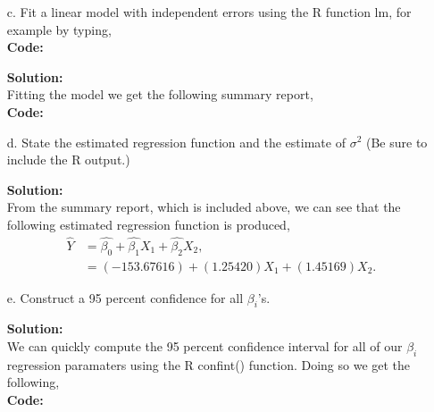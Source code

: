 \documentclass[12pt]{article}
\makeatletter
\theoremstyle{homework}
\newenvironment{exercise}[1]
{\def\@currentlabel{#1}\exercisecore}
{\endexercisecore}
\newcommand{\localhead}[1]{\par\smallskip\noindent\textbf{#1}\nobreak\\}%
\newcommand\solution{\localhead{Solution:}}
\makeatother
\begin{document}
\begin{exercise}{1}
\begin{enumerate}
  \item[c.] Fit a linear model with independent errors using the R function lm, for example by typing,\\
  \textbf{Code:}
  \begin{center}
  
  \end{center}
  \solution Fitting the model we get the following summary report, \\
  \textbf{Code:}
  \begin{center}
  
  \end{center}
  \vspace{.15in} 




  \item[d.] State the estimated regression function and the estimate of $\sigma^2$ (Be sure to include the R output.)\\
  \solution From the summary report, which is included above, we can see that the following estimated regression function is produced, 
  \begin{align*}
    \hat{Y} &= \hat{\beta_0} + \hat{\beta_1}X_1 + \hat{\beta_2}X_2,\\
     &= (-153.67616) + (1.25420)X_1 + (1.45169)X_2.
  \end{align*}
  \vspace{.15in} 



  \item[e.] Construct a 95 percent confidence for all $\beta_i$'s.\\
  \solution We can quickly compute the 95 percent confidence interval for all of our $\beta_i$ regression paramaters using 
  the R confint() function. Doing so we get the following, \\
  \textbf{Code:}
  \begin{center}
  
  \end{center}

  \vspace{.15in} 




\end{enumerate}
\end{exercise}
\end{document}
